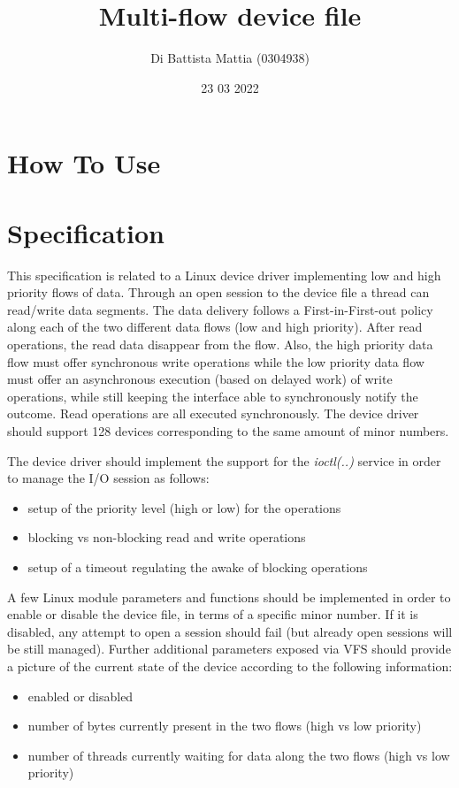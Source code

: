 \documentclass[12pt]{report}
\title{Multi-flow device file}
\author{Di Battista Mattia (0304938)}
\date{23 03 2022}
\begin{document}
\maketitle

\tableofcontents

\chapter{How To Use}
\chapter{Specification}

This specification is related to a Linux device driver implementing low and high priority flows of data.
Through an open session to the device file a thread can read/write data segments. The data delivery
follows a First-in-First-out policy along each of the two different data flows (low and high priority). After
read operations, the read data disappear from the flow. Also, the high priority data flow must offer
synchronous write operations while the low priority data flow must offer an asynchronous execution
(based on delayed work) of write operations, while still keeping the interface able to synchronously notify
the outcome. Read operations are all executed synchronously. The device driver should support 128
devices corresponding to the same amount of minor numbers.

The device driver should implement the support for the \emph{ioctl(..)} service in order to manage the I/O session
as follows:
\begin{itemize}
\item setup of the priority level (high or low) for the operations
\item blocking vs non-blocking read and write operations
\item setup of a timeout regulating the awake of blocking operations
\end{itemize}

A few Linux module parameters and functions should be implemented in order to enable or disable the
device file, in terms of a specific minor number. If it is disabled, any attempt to open a session should fail
(but already open sessions will be still managed). Further additional parameters exposed via VFS should
provide a picture of the current state of the device according to the following information:
\begin{itemize}
\item enabled or disabled
\item number of bytes currently present in the two flows (high vs low priority)
\item number of threads currently waiting for data along the two flows (high vs low priority)
\end{itemize}
\end{document}
